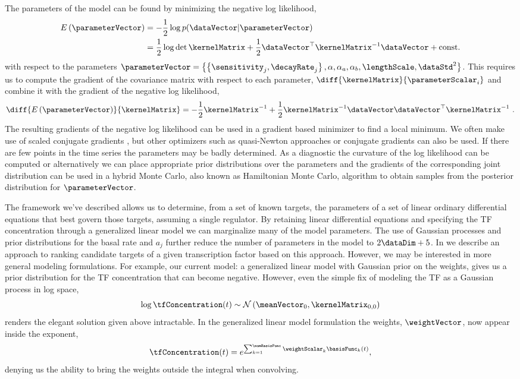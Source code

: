 \documentclass{article}
\begin{document}
The parameters of the model can be found by minimizing the negative log likelihood, 
\begin{align}
E\left(\parameterVector\right)& = -\frac{1}{2}\log p(\dataVector |
\parameterVector)\\ & = \frac{1}{2}\log \det{\kernelMatrix}  +
\frac{1}{2}\dataVector^\top\kernelMatrix^{-1}\dataVector +
\mathrm{const.}
\label{eq:error}
\end{align}
with respect to the parameters $\parameterVector =
\left\{\left\{\sensitivity_j, \decayRate_j\right\}, \alpha,
  \alpha_a, \alpha_b, \lengthScale, \dataStd^2 \right\}$. This
requires us to compute the gradient of the covariance matrix with
respect to each parameter, $\diff{\kernelMatrix}{\parameterScalar_i}$
and combine it with the gradient of the negative log likelihood,
\[
\diff{E\left(\parameterVector\right)}{\kernelMatrix} =
-\frac{1}{2}\kernelMatrix^{-1}  + \frac{1}{2}\kernelMatrix^{-1}
\dataVector\dataVector^\top\kernelMatrix^{-1} \ .
\]
The resulting gradients of the negative log likelihood can be used in
a gradient based minimizer to find a local minimum. We often make use
of scaled conjugate gradients \citep{Moller:scg93}, but other
optimizers such as quasi-Newton approaches \cite[see
e.g.][]{Zhu:lbfgsb97} or conjugate gradients can also be used. If
there are few points in the time series the parameters may be badly
determined. As a diagnostic the curvature of the log likelihood can be
computed or alternatively we can place appropriate prior distributions
over the parameters and the gradients of the corresponding joint
distribution can be used in a hybrid Monte Carlo, also known as
Hamiltonian Monte Carlo, algorithm \citep[see
e.g.][for details on hybrid Monte Carlo]{MacKay:information03} to obtain samples from the posterior
distribution for $\parameterVector$.

The framework we've described allows us to determine, from a set of
known targets, the parameters of a set of linear ordinary differential
equations that best govern those targets, assuming a single
regulator. By retaining linear differential equations and specifying
the TF concentration through a generalized linear model we can
marginalize many of the model parameters. The use of Gaussian
processes and prior distributions for the basal rate and $a_j$ further
reduce the number of parameters in the model to $2\dataDim + 5$. In
 we describe an approach to ranking
candidate targets of a given transcription factor based on this
approach. However, we may be interested in more general modeling
formulations. For example, our current model: a generalized linear
model with Gaussian prior on the weights, gives us a prior
distribution for the TF concentration that can become
negative. However, even the simple fix of modeling the TF as a
Gaussian process in log space,
\[
\log \tfConcentration(t) \sim \mathcal{N}\left(\meanVector_0, \kernelMatrix_{0,0}\right)
\]
renders the elegant solution given above intractable. In the
generalized linear model formulation the weights, $\weightVector$, now
appear inside the exponent,
\[
\tfConcentration(t)=e^{\sum_{k=1}^\numBasisFunc \weightScalar_k \basisFunc_k(t)},
\]
denying us the ability to bring the weights outside the integral when
convolving.
\end{document}
